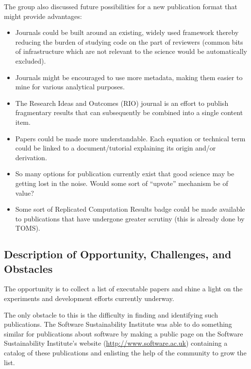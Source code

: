 The group also discussed future possibilities for a new publication format
that might provide advantages:
\begin{itemize}

\item Journals could be built around an existing, widely used framework thereby
reducing the burden of studying code on the part of reviewers (common bits of
infrastructure which are not relevant to the science would be automatically
excluded).

\item Journals might be encouraged to use more metadata, making them easier to
mine for various analytical purposes.

\item The Research Ideas and Outcomes (RIO) journal is an effort to publish
fragmentary results that can subsequently be combined into a single content
item.

\item Papers could be made more understandable. Each equation or technical term
could be linked to a document/tutorial explaining its origin and/or
derivation.

\item So many options for publication currently exist that good science may be
getting lost in the noise. Would some sort of ``upvote'' mechanism be of value?

\item Some sort of Replicated Computation Results badge could be made available
to publications that have undergone greater scrutiny (this is already done by
TOMS).
  
\end{itemize}

\subsection{Description of Opportunity, Challenges, and Obstacles}

The opportunity is to collect a list of executable papers and shine a
light on the experiments and development efforts currently underway.

The only obstacle to this is the difficulty in finding and identifying such
publications. The Software Sustainability Institute was able to do something
similar for publications about software by making a public page on the Software
Sustainability Institute's website (\url{http://www.software.ac.uk}) containing a
catalog of these publications and enlisting the help of the community to grow
the list. 

